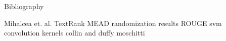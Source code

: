Bibliography

Mihalcea et. al. TextRank
MEAD randomization results
ROUGE
svm
convolution kernels collin and duffy
moschitti